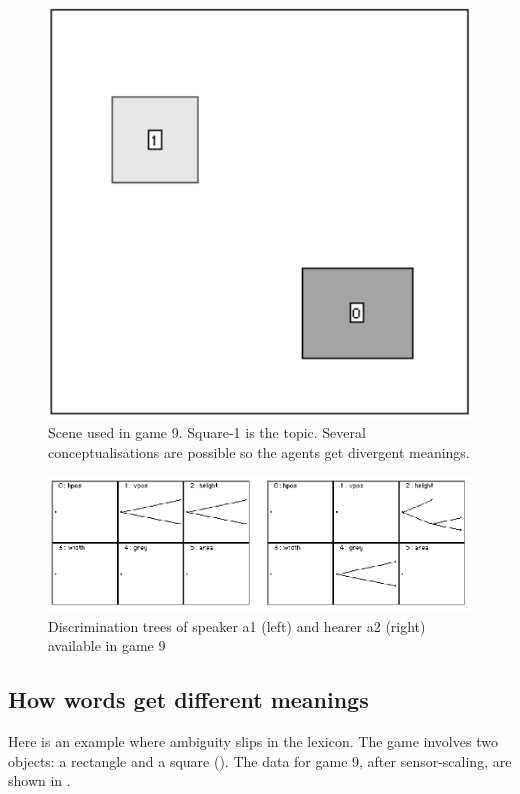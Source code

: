 \begin{figure}[htbp]
  \centerline{\includegraphics[width=.40\textwidth]{chap6/figs/scene-game9.pdf}}
\caption{\label{game9}Scene used
in game 9. Square-1 is the topic. Several conceptualisations are 
possible so the agents get divergent meanings.}
\end{figure}


\begin{figure}[htbp]
  \centerline{\includegraphics[width=\textwidth]{chap6/figs/discri-game9.pdf}}
\caption{\label{discri-game9}Discrimination trees
of speaker a1 (left) and hearer a2 (right) available 
in game 9}
\end{figure}

\subsection{How words get different meanings}

Here is an example where ambiguity slips in 
the lexicon. The game involves two 
objects: a rectangle and a square (). 
The data for game 9, after sensor-scaling, are
shown in .  


